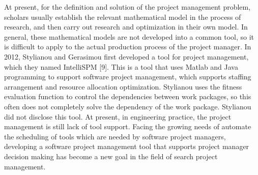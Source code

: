 At present, for the definition and solution of the project management 
problem, scholars usually establish the relevant mathematical model in the 
process of research, and then carry out research and optimization in their 
own model. In general, these mathematical models are not developed into a 
common tool, so it is difficult to apply to the actual production process of 
the project manager. In 2012, Stylianou and Gerasimou first developed a tool 
for project management, which they named IntelliSPM [9]. This is a tool that 
uses Matlab and Java programming to support software project management, 
which supports staffing arrangement and resource allocation optimization. 
Stylianou uses the fitness evaluation function to control the dependencies 
between work packages, so this often does not completely solve the dependency 
of the work package. Stylianou did not disclose this tool. At present, in 
engineering practice, the project management is still lack of tool support. 
Facing the growing needs of automate the scheduling of tools which are needed 
by software project managers, developing a software project management tool 
that supports project manager decision making has become a new goal in the 
field of search project management.

